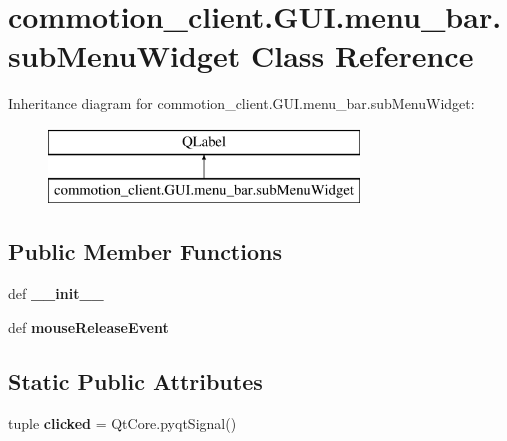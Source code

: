 \hypertarget{classcommotion__client_1_1GUI_1_1menu__bar_1_1subMenuWidget}{\section{commotion\-\_\-client.\-G\-U\-I.\-menu\-\_\-bar.\-sub\-Menu\-Widget Class Reference}
\label{classcommotion__client_1_1GUI_1_1menu__bar_1_1subMenuWidget}
}
Inheritance diagram for commotion\-\_\-client.\-G\-U\-I.\-menu\-\_\-bar.\-sub\-Menu\-Widget\-:\begin{figure}[H]
\begin{center}
\leavevmode
\includegraphics[height=2.000000cm]{classcommotion__client_1_1GUI_1_1menu__bar_1_1subMenuWidget}
\end{center}
\end{figure}
\subsection*{Public Member Functions}
\begin{DoxyCompactItemize}
\item 
\hypertarget{classcommotion__client_1_1GUI_1_1menu__bar_1_1subMenuWidget_adfb72c16f79d60a460836f368d636867}{def {\bfseries \-\_\-\-\_\-init\-\_\-\-\_\-}}\label{classcommotion__client_1_1GUI_1_1menu__bar_1_1subMenuWidget_adfb72c16f79d60a460836f368d636867}

\item 
\hypertarget{classcommotion__client_1_1GUI_1_1menu__bar_1_1subMenuWidget_a360c7df2bc1675f2eacc63ed076fba6f}{def {\bfseries mouse\-Release\-Event}}\label{classcommotion__client_1_1GUI_1_1menu__bar_1_1subMenuWidget_a360c7df2bc1675f2eacc63ed076fba6f}

\end{DoxyCompactItemize}
\subsection*{Static Public Attributes}
\begin{DoxyCompactItemize}
\item 
\hypertarget{classcommotion__client_1_1GUI_1_1menu__bar_1_1subMenuWidget_a9d362f09bf58710e2d5cc3299f20852c}{tuple {\bfseries clicked} = Qt\-Core.\-pyqt\-Signal()}\label{classcommotion__client_1_1GUI_1_1menu__bar_1_1subMenuWidget_a9d362f09bf58710e2d5cc3299f20852c}

\end{DoxyCompactItemize}


